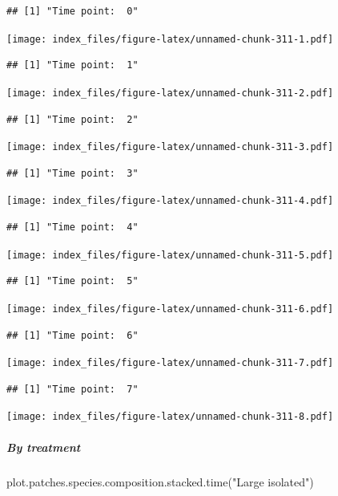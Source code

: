 \documentclass[
]{article}
\newenvironment{Shaded}{\begin{snugshade}}{\end{snugshade}}
\newcommand{\FunctionTok}[1]{\textcolor[rgb]{0.00,0.00,0.00}{#1}}
\newcommand{\NormalTok}[1]{#1}
\newcommand{\StringTok}[1]{\textcolor[rgb]{0.31,0.60,0.02}{#1}}
\begin{document}
\begin{verbatim}
## [1] "Time point:  0"
\end{verbatim}

\texttt{[image: index\_files/figure-latex/unnamed-chunk-311-1.pdf]}

\begin{verbatim}
## [1] "Time point:  1"
\end{verbatim}

\texttt{[image: index\_files/figure-latex/unnamed-chunk-311-2.pdf]}

\begin{verbatim}
## [1] "Time point:  2"
\end{verbatim}

\texttt{[image: index\_files/figure-latex/unnamed-chunk-311-3.pdf]}

\begin{verbatim}
## [1] "Time point:  3"
\end{verbatim}

\texttt{[image: index\_files/figure-latex/unnamed-chunk-311-4.pdf]}

\begin{verbatim}
## [1] "Time point:  4"
\end{verbatim}

\texttt{[image: index\_files/figure-latex/unnamed-chunk-311-5.pdf]}

\begin{verbatim}
## [1] "Time point:  5"
\end{verbatim}

\texttt{[image: index\_files/figure-latex/unnamed-chunk-311-6.pdf]}

\begin{verbatim}
## [1] "Time point:  6"
\end{verbatim}

\texttt{[image: index\_files/figure-latex/unnamed-chunk-311-7.pdf]}

\begin{verbatim}
## [1] "Time point:  7"
\end{verbatim}

\texttt{[image: index\_files/figure-latex/unnamed-chunk-311-8.pdf]}

\hypertarget{by-treatment}{%
\subparagraph{By treatment}\label{by-treatment}}

\begin{Shaded}
\begin{Highlighting}[]
\FunctionTok{plot.patches.species.composition.stacked.time}\NormalTok{(}\StringTok{"Large isolated"}\NormalTok{)}
\end{Highlighting}
\end{Shaded}
\end{document}

